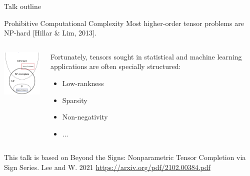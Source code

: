\documentclass[10pt, mathserif]{beamer} %
\theoremstyle{definition}
\theoremstyle{plain}
\begin{document}
\begin{frame}{Talk outline} 
 \begin{alertblock}{Prohibitive Computational Complexity}
Most higher-order tensor problems are NP-hard [Hillar \& Lim, 2013].
\end{alertblock}


\begin{columns}[T] \begin{column}{.4\textwidth}
\centering
\includegraphics[width=3cm]{Figures/NP.png}
\end{column}%
\hfill%
\begin{column}{.6\textwidth}
Fortunately, tensors sought in statistical and machine learning applications are often \color{red}specially structured:
\begin{itemize}
\item Low-rankness
\item Sparsity
\item Non-negativity
\item ...
\end{itemize}
\end{column}%
\end{columns}

\begin{block}{This talk is based on}
{\footnotesize {\color{blue}Beyond the Signs: Nonparametric Tensor Completion via Sign Series.} Lee and W. 2021
\url{https://arxiv.org/pdf/2102.00384.pdf}}
\end{block}
\end{frame}




\end{document}
